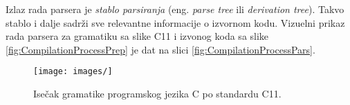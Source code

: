 Izlaz rada parsera je \emph{stablo parsiranja} (eng. \emph{parse tree} 
ili \emph{derivation tree}). Takvo stablo i dalje sadrži sve relevantne
informacije o izvornom kodu. Vizuelni prikaz rada parsera za gramatiku
sa slike C11 i izvonog koda sa slike \ref{fig:CompilationProcessPrep} je
dat na slici \ref{fig:CompilationProcessPars}.

\begin{figure}[h!]
    \texttt{[image: images/]}
    \caption{Isečak gramatike programskog jezika C po standardu C11.}
    \label{fig:CompilationProcessLex}
\end{figure}